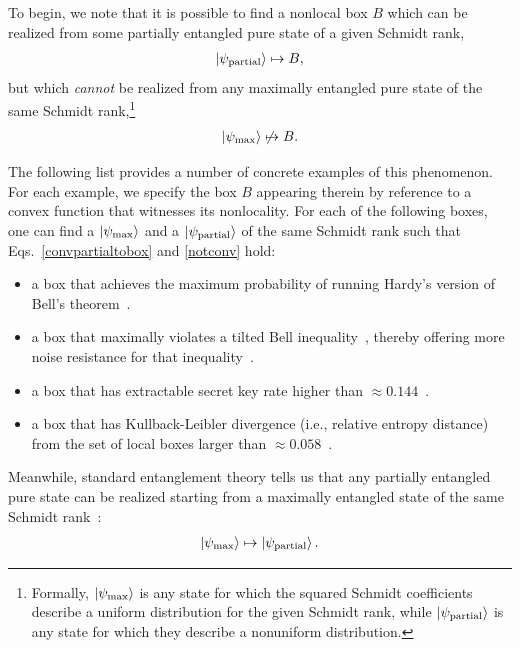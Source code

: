 \documentclass[12pt]{article}
\newcommand{\ket}[1]{\left| #1 \right>}
\theoremstyle{plain}
\theoremstyle{definition}
\begin{document}
To begin, we note that it is possible to find a nonlocal box $B$ 
which can be realized
 from some partially entangled pure state of a given Schmidt rank,
\begin{align}  \label{convpartialtobox}
\ket{\psi_{\rm partial}} \mapsto B,
\end{align}
but which  {\em cannot} be realized from any maximally entangled pure state of the same Schmidt rank,\footnote{Formally, $\ket{\psi_{\rm max}}$ is any state for which the squared Schmidt coefficients
  describe a uniform distribution for the given Schmidt rank, while $\ket{\psi_{\rm partial}}$ is any state for which they describe a nonuniform distribution. 
}
\begin{align}\label{notconv}
\ket{\psi_{\rm max}} \not\mapsto B.
\end{align}


The following list provides a number of concrete examples of this phenomenon.  For each example,
we specify the box $B$ appearing therein by reference to a convex function that witnesses its nonlocality.  
For each of the following boxes, one can find a $\ket{\psi_{\rm max}}$ and a $\ket{\psi_{\rm partial}}$ of the same Schmidt rank such that Eqs.~\eqref{convpartialtobox} and \eqref{notconv} hold:
\begin{samepage}
\begin{itemize} \label{listofnonmaximaltasks}
\item a box that achieves the maximum probability
of running
Hardy's version of Bell's theorem~\cite{Hardy1993paradox}.
\item a box that maximally violates a tilted Bell inequality~\cite{Acin2002,liang2011semi,vidick2011more}, thereby offering more noise resistance for that inequality~\cite{Acin2002}. 
\item a box that has extractable secret key rate higher than $\approx 0.144$~\cite{Scarani2006QKD,Acin2006QKD}. 
\item a box that has Kullback-Leibler divergence (i.e., relative entropy distance)
from the set of local boxes larger than $\approx 0.058$~\cite{acin2005optimal}.
\end{itemize}\end{samepage}


Meanwhile, standard entanglement theory tells us that any partially entangled pure state can be realized
starting from a maximally entangled state of the same Schmidt rank~\cite{nielsen1999conditions}:
\begin{align} \label{convmaxtopartial}
\ket{\psi_{\rm max}} \mapsto \ket{\psi_{\rm partial}}.
\end{align}
\end{document}
